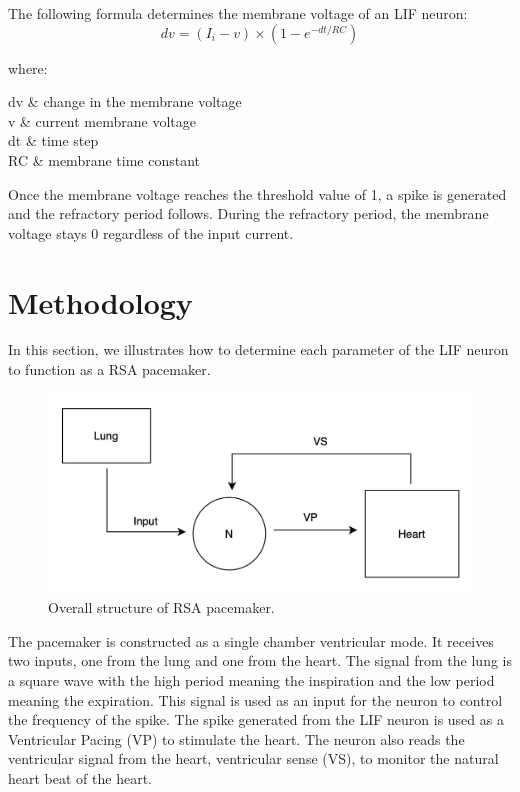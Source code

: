 \documentclass[conference]{IEEEtran}
\begin{document}
The following formula determines the membrane voltage of an LIF neuron:
\begin{equation} \label{lifneuron}
	dv = (I_i - v) \times (1 - e^{-dt/RC})
\end{equation}

where:
\begin{conditions*}
	dv     &   change in the membrane voltage \\
	
	v     &   current membrane voltage \\
	
	dt     &   time step  \\
	
	RC    &   membrane time constant
\end{conditions*}


Once the membrane voltage reaches the threshold value of 1, a spike is generated and the refractory period follows. During the refractory period, the membrane voltage stays 0 regardless of the input current.


\section{Methodology}

In this section, we illustrates how to determine each parameter of the LIF neuron to function as a  RSA pacemaker.

\begin{figure}[htbp]
	\centerline{\includegraphics[scale=0.25]{./fig/overall.png}}
	\caption{Overall structure of RSA pacemaker.}
	\label{lif}
\end{figure}

The pacemaker is constructed as a single chamber ventricular mode. It receives two inputs, one from the lung and one from the heart. The signal from the lung is a square wave with the high period meaning the inspiration and the low period meaning the expiration. This signal is used as an input for the neuron to control the frequency of the spike.  The spike generated from the LIF neuron is used as a Ventricular Pacing (VP) to stimulate the heart. The neuron also reads the ventricular signal from the heart, ventricular sense (VS), to monitor the natural heart beat of the heart.
\end{document}

